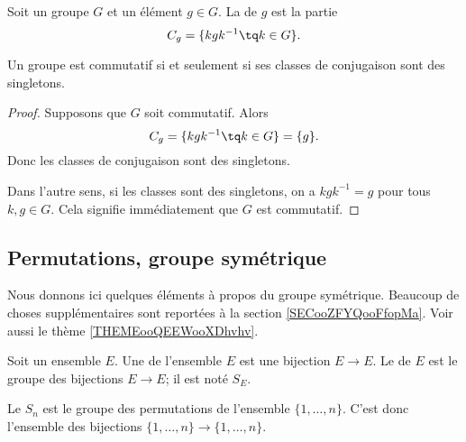 \begin{definition}       \label{DEFooOLXPooWelsZV}
    Soit un groupe \( G\) et un élément \( g\in G\). La  de \( g\) est la partie
    \begin{equation}
        C_g=\{ kgk^{-1}\tq k\in G \}.
    \end{equation}
\end{definition}

\begin{lemma}       \label{LEMooQYBJooYwMwGM}
    Un groupe est commutatif si et seulement si ses classes de conjugaison sont des singletons.
\end{lemma}

\begin{proof}
    Supposons que \( G\) soit commutatif. Alors
    \begin{equation}
        C_g=\{ kgk^{-1}\tq k\in G \}=\{ g \}.
    \end{equation}
    Donc les classes de conjugaison sont des singletons.

    Dans l'autre sens, si les classes sont des singletons, on a \( kgk^{-1}=g\) pour tous \( k,g\in G\). Cela signifie immédiatement que \( G\) est commutatif.
\end{proof}

\subsection{Permutations, groupe symétrique}

Nous donnons ici quelques éléments à propos du groupe symétrique. Beaucoup de choses supplémentaires sont reportées à la section \ref{SECooZFYQooFfopMa}. Voir aussi le thème \ref{THEMEooQEEWooXDhvhv}.

\begin{definition}      \label{DEFooJNPIooMuzIXd}
    Soit un ensemble \( E\). Une  de l'ensemble \( E\) est une bijection \( E\to E\). Le  de \( E\) est le groupe des bijections \( E\to E\); il est noté \( S_E\).

    Le  \( S_n\) est le groupe des permutations de l'ensemble \( \{ 1,\ldots,n \}\). C'est donc l'ensemble des bijections \( \{ 1,\ldots, n \}\to\{ 1,\ldots, n \}\).
\end{definition}


